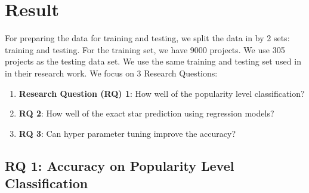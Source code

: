 \section{Result}
For preparing the data for training and testing, we split the data in \cite{013} by 2 sets: training and testing. For the training set, we have 9000 projects. We use 305 projects as the testing data set. We use the same training and testing set used in \cite{013} in their research work.  We focus on 3 Research Questions:
\begin{enumerate}
    \item \textbf{Research Question (RQ) 1}: How well of the popularity level classification?
     \item \textbf{RQ 2}: How well of the exact star prediction using regression models?
      \item \textbf{RQ 3}: Can hyper parameter tuning improve the accuracy?
\end{enumerate}



\subsection{RQ 1: Accuracy on Popularity Level Classification}

